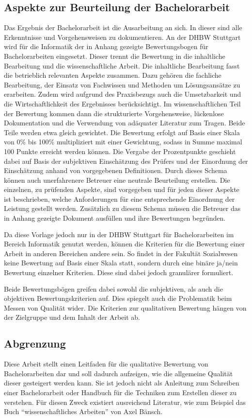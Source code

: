 \subsection{Aspekte zur Beurteilung der Bachelorarbeit}
Das Ergebnis der Bachelorarbeit ist die Ausarbeitung an sich. In dieser sind alle Erkenntnisse und Vorgehensweisen zu dokumentieren. An der \ac{DHBW} Stuttgart wird für die Informatik der in Anhang  gezeigte Bewertungsbogen für Bachelorarbeiten eingesetzt. Dieser trennt die Bewertung in die inhaltliche Bearbeitung und die wissenschaftliche Arbeit. Die inhaltliche Bearbeitung fasst die betrieblich relevanten Aspekte zusammen. Dazu gehören die fachliche Bearbeitung, der Einsatz von Fachwissen und Methoden um Lösungsansätze zu erarbeiten. Zudem wird aufgrund des Praxisbezugs auch die Umsetzbarkeit und die Wirtschaftlichkeit des Ergebnisses berücksichtigt. 
Im wissenschaftlichen Teil der Bewertung kommen dann die strukturierte Vorgehensweise, lückenlose Dokumentation und die Verwendung von adäquater Literatur zum Tragen. 
Beide Teile werden etwa gleich gewichtet. Die Bewertung erfolgt auf Basis einer Skala von 0\% bis 100\% multipliziert mit einer Gewichtung, sodass in Summe maximal 100 Punkte erreicht werden können. Die Vergabe der Prozentpunkte geschieht dabei auf Basis der subjektiven Einschätzung des Prüfers und der Einordnung der Einschätzung anhand von vorgegebenen Definitionen. 
Durch dieses Schema können auch unerfahrenere Betreuer eine neutrale Beurteilung erstellen. Die einzelnen, zu prüfenden Aspekte, sind vorgegeben und für jeden dieser Aspekte ist beschrieben, welche Anforderungen für eine entsprechende Einordnung der Leistung gestellt werden. 
Zusätzlich zu diesem Schema müssen die Betreuer das in Anhang  gezeigte Dokument ausfüllen und ihre Bewertungen begründen. 

Da diese Vorlage jedoch nur in der \ac{DHBW} Stuttgart für Bachelorarbeiten im Bereich Informatik genutzt werden, können die Kriterien für die Bewertung einer Arbeit in anderen Bereichen andere sein. So findet in der Fakultät Sozialwesen keine Bewertung auf Basis einer Skala statt, sondern durch eine binäre ja/nein Bewertung einzelner Kriterien. Diese sind dabei jedoch granulärer formuliert.\cite[Vgl.][]{DHBW-Sozial:2014}

Beide Bewertungsbögen greifen dabei sowohl die subjektiven, als auch die objektiven Bewertungskriterien auf. Dies spiegelt auch die Problematik beim Messen von Qualität wider. Die Kriterien zur qualitativen Bewertung hängen von der Zielgruppe und dem Inhalt der Arbeit ab.

\subsection{Abgrenzung}
Diese Arbeit stellt einen Leitfaden für die qualitative Bewertung von Bachelorarbeiten dar und soll dadurch aufzeigen, wie die allgemeine Qualität dieser gesteigert werden kann. Sie ist jedoch nicht als Anleitung zum Schreiben einer Bachelorarbeit oder Handbuch für die Techniken zum Erstellen dieser zu verstehen. Für diesen Zweck existiert ausreichend Literatur, wie zum Beispiel das Buch \enquote{wissenschaftliches Arbeiten} von Axel Bänsch.\cite{Baensch:2013}
